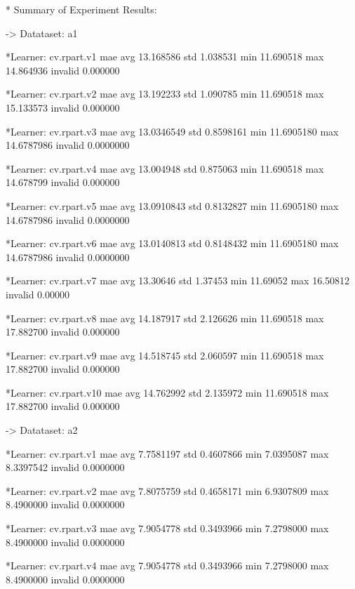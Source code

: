 \documentclass{article}
\begin{document}
\begin{Schunk}
\begin{Soutput}
* Summary of Experiment Results:


-> Datataset:  a1 

	*Learner: cv.rpart.v1 
              mae
avg     13.168586
std      1.038531
min     11.690518
max     14.864936
invalid  0.000000

	*Learner: cv.rpart.v2 
              mae
avg     13.192233
std      1.090785
min     11.690518
max     15.133573
invalid  0.000000

	*Learner: cv.rpart.v3 
               mae
avg     13.0346549
std      0.8598161
min     11.6905180
max     14.6787986
invalid  0.0000000

	*Learner: cv.rpart.v4 
              mae
avg     13.004948
std      0.875063
min     11.690518
max     14.678799
invalid  0.000000

	*Learner: cv.rpart.v5 
               mae
avg     13.0910843
std      0.8132827
min     11.6905180
max     14.6787986
invalid  0.0000000

	*Learner: cv.rpart.v6 
               mae
avg     13.0140813
std      0.8148432
min     11.6905180
max     14.6787986
invalid  0.0000000

	*Learner: cv.rpart.v7 
             mae
avg     13.30646
std      1.37453
min     11.69052
max     16.50812
invalid  0.00000

	*Learner: cv.rpart.v8 
              mae
avg     14.187917
std      2.126626
min     11.690518
max     17.882700
invalid  0.000000

	*Learner: cv.rpart.v9 
              mae
avg     14.518745
std      2.060597
min     11.690518
max     17.882700
invalid  0.000000

	*Learner: cv.rpart.v10 
              mae
avg     14.762992
std      2.135972
min     11.690518
max     17.882700
invalid  0.000000


-> Datataset:  a2 

	*Learner: cv.rpart.v1 
              mae
avg     7.7581197
std     0.4607866
min     7.0395087
max     8.3397542
invalid 0.0000000

	*Learner: cv.rpart.v2 
              mae
avg     7.8075759
std     0.4658171
min     6.9307809
max     8.4900000
invalid 0.0000000

	*Learner: cv.rpart.v3 
              mae
avg     7.9054778
std     0.3493966
min     7.2798000
max     8.4900000
invalid 0.0000000

	*Learner: cv.rpart.v4 
              mae
avg     7.9054778
std     0.3493966
min     7.2798000
max     8.4900000
invalid 0.0000000


\end{Soutput}
\end{Schunk}
\end{document}
